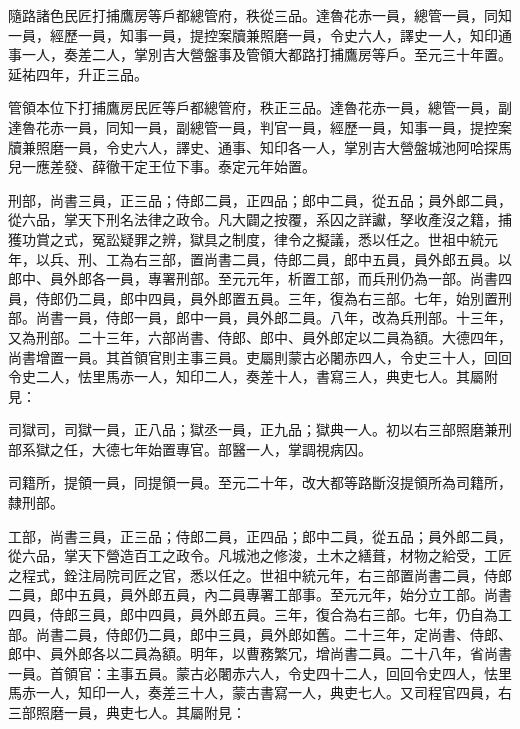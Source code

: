\begin{pinyinscope}
 隨路諸色民匠打捕鷹房等戶都總管府，秩從三品。達魯花赤一員，總管一員，同知一員，經歷一員，知事一員，提控案牘兼照磨一員，令史六人，譯史一人，知印通事一人，奏差二人，掌別吉大營盤事及管領大都路打捕鷹房等戶。至元三十年置。延祐四年，升正三品。



 管領本位下打捕鷹房民匠等戶都總管府，秩正三品。達魯花赤一員，總管一員，副達魯花赤一員，同知一員，副總管一員，判官一員，經歷一員，知事一員，提控案牘兼照磨一員，令史六人，譯史、通事、知印各一人，掌別吉大營盤城池阿哈探馬兒一應差發、薛徹干定王位下事。泰定元年始置。



 刑部，尚書三員，正三品；侍郎二員，正四品；郎中二員，從五品；員外郎二員，從六品，掌天下刑名法律之政令。凡大闢之按覆，系囚之詳讞，孥收產沒之籍，捕獲功賞之式，冤訟疑罪之辨，獄具之制度，律令之擬議，悉以任之。世祖中統元年，以兵、刑、工為右三部，置尚書二員，侍郎二員，郎中五員，員外郎五員。以郎中、員外郎各一員，專署刑部。至元元年，析置工部，而兵刑仍為一部。尚書四員，侍郎仍二員，郎中四員，員外郎置五員。三年，復為右三部。七年，始別置刑部。尚書一員，侍郎一員，郎中一員，員外郎二員。八年，改為兵刑部。十三年，又為刑部。二十三年，六部尚書、侍郎、郎中、員外郎定以二員為額。大德四年，尚書增置一員。其首領官則主事三員。吏屬則蒙古必闍赤四人，令史三十人，回回令史二人，怯里馬赤一人，知印二人，奏差十人，書寫三人，典吏七人。其屬附見：



 司獄司，司獄一員，正八品；獄丞一員，正九品；獄典一人。初以右三部照磨兼刑部系獄之任，大德七年始置專官。部醫一人，掌調視病囚。



 司籍所，提領一員，同提領一員。至元二十年，改大都等路斷沒提領所為司籍所，隸刑部。



 工部，尚書三員，正三品；侍郎二員，正四品；郎中二員，從五品；員外郎二員，從六品，掌天下營造百工之政令。凡城池之修浚，土木之繕葺，材物之給受，工匠之程式，銓注局院司匠之官，悉以任之。世祖中統元年，右三部置尚書二員，侍郎二員，郎中五員，員外郎五員，內二員專署工部事。至元元年，始分立工部。尚書四員，侍郎三員，郎中四員，員外郎五員。三年，復合為右三部。七年，仍自為工部。尚書二員，侍郎仍二員，郎中三員，員外郎如舊。二十三年，定尚書、侍郎、郎中、員外郎各以二員為額。明年，以曹務繁冗，增尚書二員。二十八年，省尚書一員。首領官：主事五員。蒙古必闍赤六人，令史四十二人，回回令史四人，怯里馬赤一人，知印一人，奏差三十人，蒙古書寫一人，典吏七人。又司程官四員，右三部照磨一員，典吏七人。其屬附見：




\end{pinyinscope}
